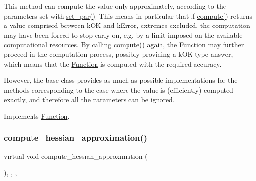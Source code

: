 This method can compute the value only approximately, according to the parameters set with \mbox{\hyperlink{class_s_m_spp__di__unipi__it_1_1_thin_compute_interface_a73669f587bb938b587c54ad7e73ec297}{set\+\_\+par()}}. This means in particular that if \mbox{\hyperlink{class_s_m_spp__di__unipi__it_1_1_linear_function_afc8ff54ab05d22f4cca0fb0bfbeb7a49}{compute()}} returns a value comprised between k\+OK and k\+Error, extremes excluded, the computation may have been forced to stop early on, e.\+g. by a limit imposed on the available computational resources. By calling \mbox{\hyperlink{class_s_m_spp__di__unipi__it_1_1_linear_function_afc8ff54ab05d22f4cca0fb0bfbeb7a49}{compute()}} again, the \mbox{\hyperlink{class_s_m_spp__di__unipi__it_1_1_function}{Function}} may further proceed in the computation process, possibly providing a k\+O\+K-\/type answer, which means that the \mbox{\hyperlink{class_s_m_spp__di__unipi__it_1_1_function}{Function}} is computed with the required accuracy.

However, the base class provides as much as possible implementations for the methods corresponding to the case where the value is (efficiently) computed exactly, and therefore all the parameters can be ignored. 

Implements \mbox{\hyperlink{class_s_m_spp__di__unipi__it_1_1_function_a504d4e3e174c7a518cc66156a8a45ce5}{Function}}.

\mbox{\label{class_s_m_spp__di__unipi__it_1_1_linear_function_a4aab1ee65194b8af72eb1c122205c707}} 
\subsubsection{\texorpdfstring{compute\+\_\+hessian\+\_\+approximation()}{compute\_hessian\_approximation()}}
{\footnotesize\ttfamily virtual void compute\+\_\+hessian\+\_\+approximation (\begin{DoxyParamCaption}\item[{void}]{ }\end{DoxyParamCaption})\hspace{0.3cm}{\ttfamily [inline]}, {\ttfamily [final]}, {\ttfamily [override]}, {\ttfamily [virtual]}}



